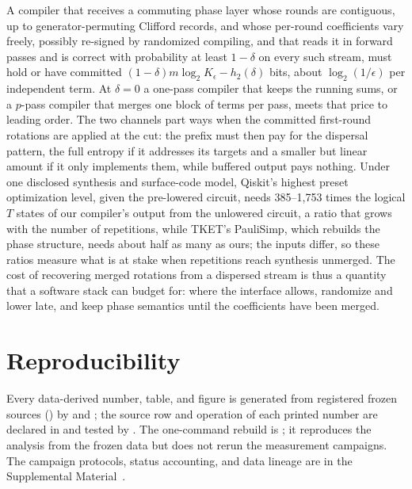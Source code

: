 \documentclass[aps,prx,reprint,superscriptaddress,floatfix,longbibliography]{revtex4-2}
\begin{document}
A compiler that receives a commuting phase layer whose rounds are
contiguous, up to generator-permuting Clifford records, and whose
per-round coefficients vary freely, possibly re-signed by randomized
compiling, and that reads it in forward passes and is correct with
probability at least $1-\delta$ on every such stream, must hold or have
committed $(1-\delta)m\log_2K_\epsilon-h_2(\delta)$ bits, about
$\log_2(1/\epsilon)$ per independent term.  At $\delta=0$ a one-pass
compiler that keeps the running sums, or a $p$-pass compiler that merges
one block of terms per pass, meets that price to leading order.  The two
channels part ways when the committed first-round rotations are applied
at the cut: the prefix must then pay for the dispersal pattern, the full
entropy if it addresses its targets and a smaller but linear amount if it
only implements them, while buffered output pays nothing.  Under one
disclosed synthesis and surface-code model, Qiskit's highest preset
optimization level, given the pre-lowered circuit, needs 385--1{,}753
times the logical $T$ states of our compiler's output from the unlowered
circuit, a ratio that grows with the number of repetitions, while TKET's
PauliSimp, which rebuilds the phase structure, needs about half as many as
ours; the inputs differ, so these ratios measure what is at stake when
repetitions reach synthesis unmerged.  The cost of recovering merged
rotations from a dispersed stream is thus a quantity that a software stack
can budget for: where the interface allows, randomize and lower late, and
keep phase semantics until the coefficients have been merged.

\ifdefined\PRRSubmissionVersion\else
\section*{Reproducibility}
\label{sec:reproducibility}

Every data-derived number, table, and figure is generated from registered
frozen sources () by
 and ;
the source row and operation of each printed number are declared in
 and tested by
.  The one-command rebuild is
; it reproduces the analysis from
the frozen data but does not rerun the measurement campaigns.  The
campaign protocols, status accounting, and data lineage are in the
Supplemental Material~\cite{supplement}.
\fi
\end{document}
